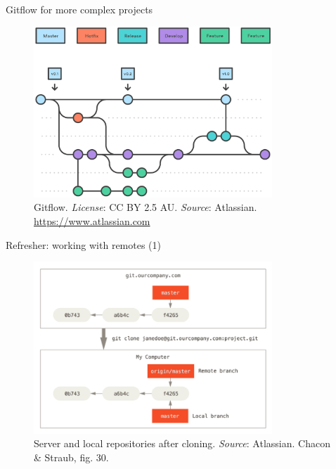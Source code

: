 \documentclass[handout]{beamer}
\begin{document}
\begin{frame}{Gitflow for more complex projects}
\begin{figure}
	\includegraphics[width=0.8\textwidth]{figures/gitflow.pdf}
	\caption{Gitflow. \textit{License}: CC BY 2.5 AU. \textit{Source}: Atlassian. \href{https://www.atlassian.com/git/tutorials/comparing-workflows/gitflow-workflow}{https://www.atlassian.com}}
\end{figure}
\end{frame}

\begin{frame}{Refresher: working with remotes (1)}
\begin{figure}
	\includegraphics[width=0.8\textwidth]{figures/fig30_clone.png}
	\caption{Server and local repositories after cloning. \textit{Source}: Atlassian. Chacon \& Straub, fig. 30.}
\end{figure}
\end{frame}
\end{document}
